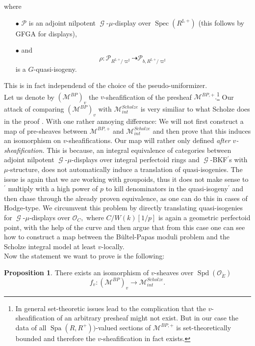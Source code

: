 \documentclass[a4paper,10,5 pt]{amsart}
\theoremstyle{definition}
\newtheorem{proposition}[Satz]{Proposition}
\DeclareMathOperator{\Spec}{Spec}
\DeclareMathOperator{\Spa}{Spa}
\DeclareMathOperator{\Spd}{Spd}
\DeclareMathOperator{\G}{\mathcal{G}}
\begin{document}
where
\begin{enumerate}
\item[$\bullet$] $\mathcal{P}$ is an adjoint nilpotent $\G$-$\mu$-display over $\Spec(R^{\sharp,+})$ (this follows by GFGA for displays),
\item[$\bullet$] and $$\rho\colon \mathcal{P}_{R^{\sharp,+}/\varpi^{\sharp}}\dashrightarrow \mathcal{P}_{b,R^{\sharp,+}/\varpi^{\sharp}}$$ is a $G$-quasi-isogeny.
\end{enumerate}
This is in fact independend of the choice of the pseudo-uniformizer.
\\
Let us denote by $(\mathcal{M}^{BP})_{v}$ the $v$-sheafification of the presheaf $\mathcal{M}^{BP,+}.$\footnote{In general set-theoretic issues lead to the complication that the $v$-sheafification of an arbitrary presheaf might not exist. But in our case the data of all $\Spa(R,R^{+}))$-valued sections of $\mathcal{M}^{BP,+}$ is set-theoretically bounded and therefore the $v$-sheafification in fact exists.} Our attack of comparing $(\mathcal{M}^{BP})_{v}$ with $\mathcal{M}^{Scholze}_{int}$ is very similiar to what Scholze does in the proof \cite[Thm.25.1.2.]{Berkeley lectures}. With one rather annoying difference: We will not first construct a map of pre-sheaves between $\mathcal{M}^{BP,+}$ and $\mathcal{M}^{Scholze}_{int}$ and then prove that this induces an isomorphism on $v$-sheafifications. Our map will rather only defined \textit{after $v$-sheafification.} This is because, an integral equivalence of categories between adjoint nilpotent $\G$-$\mu$-displays over integral perfectoid rings and $\G$-BKF$^{\prime}$s with $\mu$-structure, does not automatically induce a translation of quasi-isogenies. The issue is again that we are working with groupoids, thus it does not make sense to $^{\prime}$ multiply with a high power of $p$ to kill denominators in the quasi-isogeny$^{\prime}$ and then chase through the already proven equivalence, as one can do this in cases of Hodge-type. We circumvent this problem by directly translating quasi-isogenies for $\G$-$\mu$-displays over $\mathcal{O}_{C},$ where $C/W(k)[1/p]$ is again a geometric perfectoid point, with the help of the curve and then argue that from this case one can see how to construct a map between the Bültel-Papas moduli problem and the Scholze integral model at least $v$-locally.
\\
Now the statement we want to prove is the following:
\begin{proposition}
There exists an isomorphism of $v$-sheaves over $\Spd(\mathcal{O}_{\breve{E}})$
$$
f_{v}\colon (\mathcal{M}^{BP})_{v}\rightarrow \mathcal{M}_{int}^{Scholze}.
$$
\end{proposition}
\end{document}
